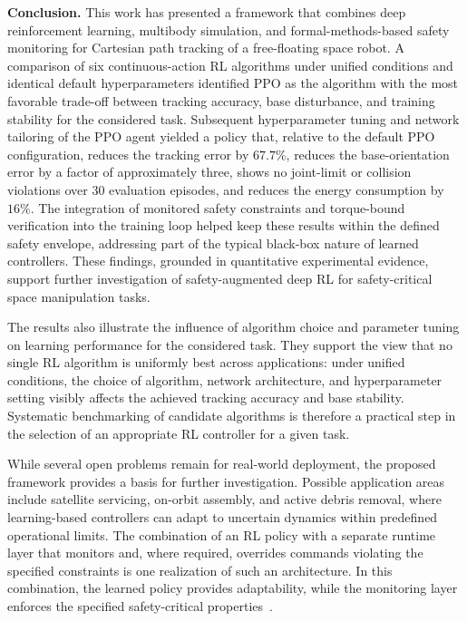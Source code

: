 \documentclass{ieeeaccess}
\begin{document}
\textbf{Conclusion.} This work has presented a framework that combines deep reinforcement learning, multibody simulation,
and formal-methods-based safety monitoring for Cartesian path tracking of a free-floating space robot. A
comparison of six continuous-action RL algorithms under unified conditions and identical default
hyperparameters identified PPO as the algorithm
with the most favorable trade-off between tracking accuracy, base disturbance, and training stability for
the considered task. Subsequent hyperparameter tuning and network tailoring of the PPO agent yielded
a policy that, relative to the default PPO configuration, reduces the tracking error by
$67.7\%$, reduces the base-orientation error by a factor of approximately three, shows no joint-limit
or collision violations over 30 evaluation episodes, and reduces the energy consumption by $16\%$.
The integration
of monitored safety constraints and torque-bound verification into the training loop helped keep these
results
within the defined safety envelope, addressing part of the typical black-box
nature of learned controllers. These findings, grounded in quantitative experimental evidence,
support further investigation of safety-augmented deep RL for safety-critical space manipulation tasks.



The results also illustrate the influence of algorithm choice and parameter tuning on learning
performance for the considered task. They support the view that no single RL algorithm
is uniformly best across applications: under unified conditions, the choice of algorithm, network architecture,
and hyperparameter setting visibly affects the achieved tracking accuracy and base stability. Systematic benchmarking
of candidate algorithms is therefore a practical step in the selection of an appropriate
RL controller for a given task.

While several open problems remain for real-world deployment, the proposed framework provides a basis
for further investigation. Possible application areas include satellite servicing, on-orbit assembly, and active debris
removal, where learning-based controllers can adapt to uncertain dynamics within predefined operational limits. The
combination of an RL policy with a separate runtime layer that monitors and, where
required, overrides commands violating the specified constraints is one realization of such an architecture.
In this combination, the learned policy provides adaptability, while the monitoring layer enforces the
specified safety-critical properties~\cite{b1,b23}.
\end{document}
